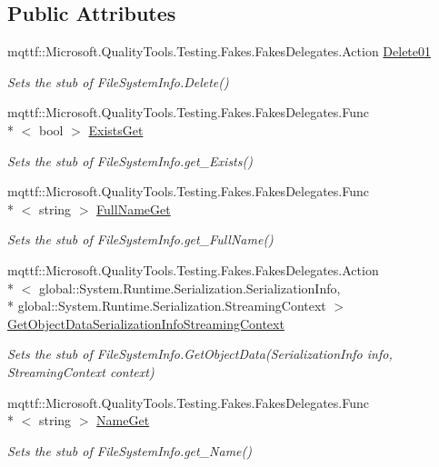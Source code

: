\subsection*{Public Attributes}
\begin{DoxyCompactItemize}
\item 
mqttf\-::\-Microsoft.\-Quality\-Tools.\-Testing.\-Fakes.\-Fakes\-Delegates.\-Action \hyperlink{class_system_1_1_i_o_1_1_fakes_1_1_stub_file_system_info_a8122d77008bf78c3bc92ef3a4c199d1d}{Delete01}
\begin{DoxyCompactList}\small\item\em Sets the stub of File\-System\-Info.\-Delete()\end{DoxyCompactList}\item 
mqttf\-::\-Microsoft.\-Quality\-Tools.\-Testing.\-Fakes.\-Fakes\-Delegates.\-Func\\*
$<$ bool $>$ \hyperlink{class_system_1_1_i_o_1_1_fakes_1_1_stub_file_system_info_aa0fde4ab534435bca656f54477f55ca2}{Exists\-Get}
\begin{DoxyCompactList}\small\item\em Sets the stub of File\-System\-Info.\-get\-\_\-\-Exists()\end{DoxyCompactList}\item 
mqttf\-::\-Microsoft.\-Quality\-Tools.\-Testing.\-Fakes.\-Fakes\-Delegates.\-Func\\*
$<$ string $>$ \hyperlink{class_system_1_1_i_o_1_1_fakes_1_1_stub_file_system_info_ada4911278ba11413b3bb291b1da41b6e}{Full\-Name\-Get}
\begin{DoxyCompactList}\small\item\em Sets the stub of File\-System\-Info.\-get\-\_\-\-Full\-Name()\end{DoxyCompactList}\item 
mqttf\-::\-Microsoft.\-Quality\-Tools.\-Testing.\-Fakes.\-Fakes\-Delegates.\-Action\\*
$<$ global\-::\-System.\-Runtime.\-Serialization.\-Serialization\-Info, \\*
global\-::\-System.\-Runtime.\-Serialization.\-Streaming\-Context $>$ \hyperlink{class_system_1_1_i_o_1_1_fakes_1_1_stub_file_system_info_a67447e484510f663a3511e1a94c78e39}{Get\-Object\-Data\-Serialization\-Info\-Streaming\-Context}
\begin{DoxyCompactList}\small\item\em Sets the stub of File\-System\-Info.\-Get\-Object\-Data(\-Serialization\-Info info, Streaming\-Context context)\end{DoxyCompactList}\item 
mqttf\-::\-Microsoft.\-Quality\-Tools.\-Testing.\-Fakes.\-Fakes\-Delegates.\-Func\\*
$<$ string $>$ \hyperlink{class_system_1_1_i_o_1_1_fakes_1_1_stub_file_system_info_a6cd475445a9b52567790b7f28240c3ea}{Name\-Get}
\begin{DoxyCompactList}\small\item\em Sets the stub of File\-System\-Info.\-get\-\_\-\-Name()\end{DoxyCompactList}\end{DoxyCompactItemize}
